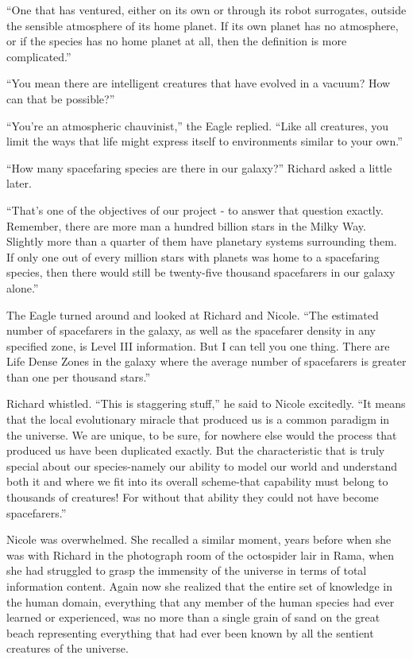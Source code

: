 \documentclass[]{article}
\begin{document}
{“One that has ventured, either on its own or through its robot surrogates, outside the sensible atmosphere of its home planet.  If its own planet has no atmosphere, or if the species has no home planet at all, then the definition is more complicated.”

“You mean there are intelligent creatures that have evolved in a vacuum? How can that be possible?”

“You’re an atmospheric chauvinist,” the Eagle replied.  “Like all creatures, you limit the ways that life might express itself to environments similar to your own.”

“How many spacefaring species are there in our galaxy?” Richard asked a little later.

“That’s one of the objectives of our project - to answer that question exactly.  Remember, there are more man a hundred billion stars in the Milky Way.  Slightly more than a quarter of them have planetary systems surrounding them.  If only one out of every million stars with planets was home to a spacefaring species, then there would still be twenty-five thousand spacefarers in our galaxy alone.”

The Eagle turned around and looked at Richard and Nicole.  “The estimated number of spacefarers in the galaxy, as well as the spacefarer density in any specified zone, is Level III information.  But I can tell you one thing.  There are Life Dense Zones in the galaxy where the average number of spacefarers is greater than one per thousand stars.”

Richard whistled.  “This is staggering stuff,” he said to Nicole excitedly.  “It means that the local evolutionary miracle that produced us is a common paradigm in the universe.  We are unique, to be sure, for nowhere else would the process that produced us have been duplicated exactly.  But the characteristic that is truly special about our species-namely our ability to model our world and understand both it and where we fit into its overall scheme-that capability must belong to thousands of creatures! For without that ability they could not have become spacefarers.”

Nicole was overwhelmed.  She recalled a similar moment, years before when she was with Richard in the photograph room of the octospider lair in Rama, when she had struggled to grasp the immensity of the universe in terms of total information content.  Again now she realized that the entire set of knowledge in the human domain, everything that any member of the human species had ever learned or experienced, was no more than a single grain of sand on the great beach representing everything that had ever been known by all the sentient creatures of the universe.

}
\end{document}
